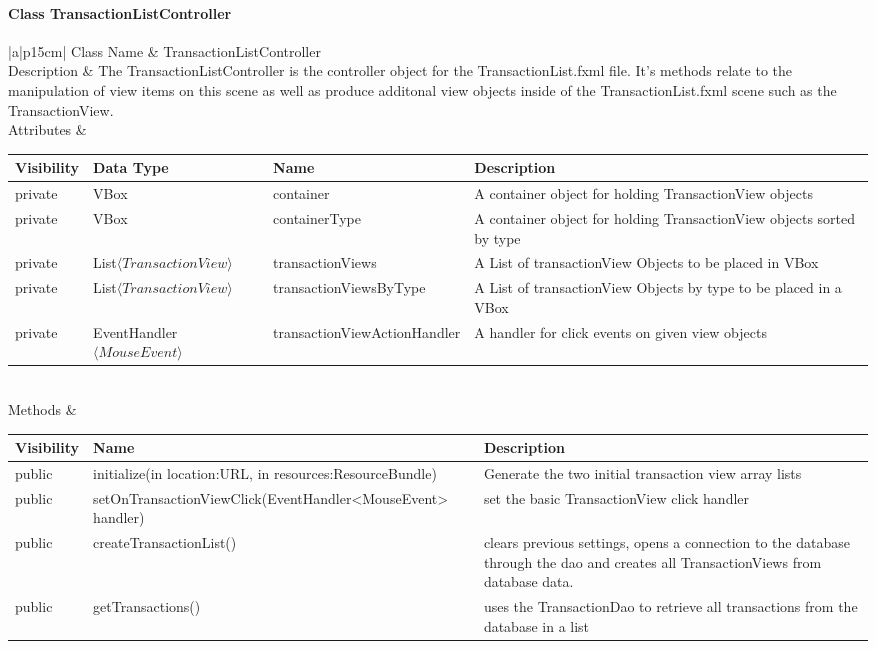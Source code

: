 \documentclass[12pt]{article}
\begin{document}
\paragraph{Class TransactionListController}
\begin{table}[H]
	\begin{tabular}{|a|p{15cm}|}
		\hline
		{Class Name} & {TransactionListController} \\
		\hline
		Description & The TransactionListController is the controller object for the TransactionList.fxml file. It's methods relate to the manipulation of view items on this scene as well as produce additonal view objects inside of the TransactionList.fxml scene such as the TransactionView.\\
		\hline
		Attributes & 
		\begin{tabular}{| p{1.5cm} | p{5cm} | p{3.5cm} | p{3.45cm} |}
			\hline
			\rowcolor{lightgray}
			Visibility & Data Type & Name & Description \\
			\hline
			\rowcolor{white}
			private & VBox & container & A container object for holding TransactionView objects\\ 
			\hline
			private & VBox & containerType & A container object for holding TransactionView objects sorted by type\\ 
			\hline
			private & List$\langle TransactionView \rangle$ & transactionViews & A List of transactionView Objects to be placed in VBox\\
			\hline
			private & List$\langle TransactionView \rangle$ & transactionViewsByType & A List of transactionView Objects by type to be placed in a VBox\\
			\hline
			private & EventHandler$\langle MouseEvent \rangle$  & transactionViewActionHandler & A handler for click events on given view objects\\		
			\hline	
		\end{tabular} \\
		\hline
		Methods & 		 
		\begin{tabular}{| p{2cm} | p{5cm} | p{6.9cm} |}
			\hline
			\rowcolor{gray}
			{Visibility} &{Name} & {Description} \\
			\hline
			\rowcolor{white}			
			public &  initialize(in location:URL, in resources:ResourceBundle) & Generate the two initial transaction view array lists\\
			\hline
			public & setOnTransactionViewClick(EventHandler<MouseEvent> handler) & set the basic TransactionView click handler\\
			\hline
			public & createTransactionList() & clears previous settings, opens a connection to the database through the dao and creates all TransactionViews from database data. \\
			\hline
			public &  getTransactions() & uses the TransactionDao to retrieve all transactions from the database in a list\\
			\hline			
		\end{tabular}								 
	\end{tabular}
\end{table}
\end{document}
